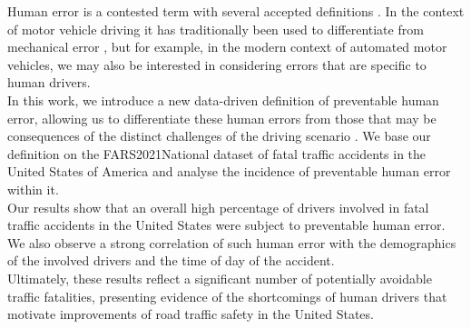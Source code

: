\documentclass{article}
\theoremstyle{plain}
\theoremstyle{definition}
\theoremstyle{remark}
\begin{document}
Human error is a contested term with several accepted definitions \citep{reason2000human, woods2017behind, strauch2017investigating}. In the context of motor vehicle driving it has traditionally been used to differentiate from mechanical error \citep{stanton2009human}, but for example, in the modern context of automated motor vehicles, we may also be interested in considering errors that are specific to human drivers.
\\
In this work, we introduce a new data-driven definition of preventable human error, allowing us to differentiate these human errors from those that may be consequences of the distinct challenges of the driving scenario \citep{guanetti2018control}. We base our definition on the FARS2021National dataset \citep{fars} of fatal traffic accidents in the United States of America and analyse the incidence of preventable human error within it. 
\\
Our results show that an overall high percentage of drivers involved in fatal traffic accidents in the United States were subject to preventable human error. We also observe a strong correlation of such human error with the demographics of the involved drivers and the time of day of the accident.
\\
Ultimately, these results reflect a significant number of potentially avoidable traffic fatalities, presenting evidence of the shortcomings of human drivers that motivate improvements of road traffic safety in the United States.


\end{document}
